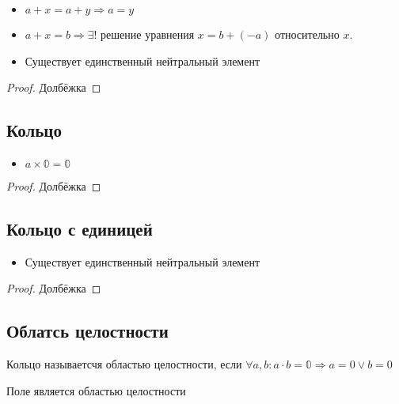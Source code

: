 \documentclass[12pt, a4paper]{article}
\begin{document}
    \begin{itemize}
        \item $a + x = a + y \Longrightarrow a = y$
        \item $a + x = b \Longrightarrow \exists!$ решение уравнения $x = b + (-a)$ относительно $x$.
        \item Существует единственный нейтральный элемент
    \end{itemize}
    \begin{proof}
        Долбёжка
    \end{proof}



    \subsection{Кольцо}

    \begin{itemize}
        \item $a \times \mathbb{0} = \mathbb{0}$
    \end{itemize}
    \begin{proof}
        Долбёжка
    \end{proof}



    \subsection{Кольцо с единицей}

    \begin{itemize}
        \item Существует единственный нейтральный элемент
    \end{itemize}
    \begin{proof}
        Долбёжка
    \end{proof}


    \subsection{Облатсь целостности}

    \begin{definition}
        Кольцо называетсчя областью целостности, если $\forall a, b: a \cdot b = \mathbb{0} \Rightarrow a = 0 \lor b = 0$
    \end{definition}


    \begin{theorem}
        Поле является областью целостности
    \end{theorem}
\end{document}
